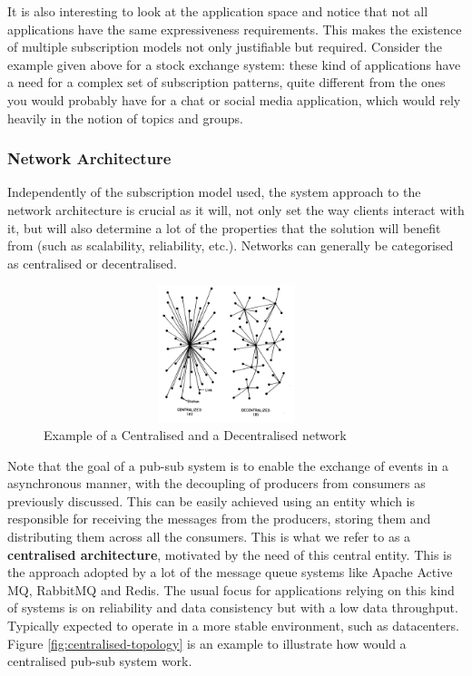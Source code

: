 It is also interesting to look at the application space and notice that
not all applications have the same expressiveness requirements. This
makes the existence of multiple subscription models not only justifiable
but required. Consider the example given above for a stock exchange
system: these kind of applications have a need for a complex set of
subscription patterns, quite different from the ones you would probably
have for a chat or social media application, which would rely heavily in
the notion of topics and groups.

\subsubsection{Network Architecture}\label{network-architecture}

Independently of the subscription model used, the system approach to the
network architecture is crucial as it will, not only set the way clients
interact with it, but will also determine a lot of the properties that
the solution will benefit from (such as scalability, reliability, etc.). Networks
can generally be categorised as centralised or decentralised.

\begin{figure}[hb!]
  \centering
  \includegraphics[max height=4cm,max width=0.95\textwidth]{img/network-archs.png}
  \caption{Example of a Centralised and a Decentralised network}
  \label{fig:network-archs}
\end{figure}

Note that the goal of a pub-sub system is to enable the exchange of
events in a asynchronous manner, with the decoupling of producers from
consumers as previously discussed. This can be easily achieved using an
entity which is responsible for receiving the messages from the
producers, storing them and distributing them across all the consumers. This is
what we refer to as a \textbf{centralised architecture}, motivated by the need of
this central entity. This is the approach adopted by a lot of the
message queue systems like Apache Active MQ, RabbitMQ and Redis. The
usual focus for applications relying on this kind of systems is on
reliability and data consistency but with a low data throughput. Typically expected
to operate in a more stable environment, such as datacenters. Figure \ref{fig:centralised-topology}
is an example to illustrate how would a centralised pub-sub system work.

